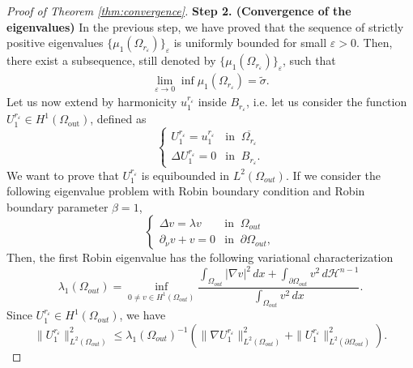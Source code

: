 \documentclass[12pt,reqno]{amsart}
\numberwithin{equation}{section}
\numberwithin{theorem}{section}
\numberwithin{equation}{section}
\numberwithin{theorem}{section}
\begin{document}
\begin{proof}[Proof of Theorem \ref{thm:convergence}]
  \textbf{Step 2. (Convergence of the eigenvalues)}  In the previous step, we have proved that the sequence of strictly positive eigenvalues $ \{\mu_1 (\Omega_{r_{\varepsilon}})\}_{\varepsilon}$ is uniformly bounded for small $\varepsilon >0$. Then, there exist a subsequence, still denoted by $\{\mu_1 (\Omega_{r_{\varepsilon}})\}_{\varepsilon}$, such that
     \begin{align*}
         \lim_{\varepsilon \to 0} \inf \mu_1(\Omega_{r_{\varepsilon}}) = \tilde{\sigma}.
     \end{align*}
Let us now extend by harmonicity $u_1^{r_\varepsilon}$ inside $B_{r_\varepsilon}$, i.e. let us consider
the function $U_1^{r_\varepsilon}\in H^1(\Omega_\mathrm{out})$, defined as
\begin{equation*}
    \begin{cases}
        U_1^{r_\varepsilon}=u_1^{r_\varepsilon} & \text{in}\;\; \overline{\Omega_{r_\varepsilon}}\\
        \Delta U_1^{r_\varepsilon}=0 & \text{in}\;\; B_{r_\varepsilon}.
    \end{cases}
\end{equation*}
We want to prove that $U_1^{r_\varepsilon}$ is equibounded in $L^2(\Omega_{out})$. If we consider the following eigenvalue problem with Robin boundary condition and Robin boundary  parameter $\beta=1$,
\begin{equation*}
\begin{cases}
    \Delta v = \lambda v & \text{in}\;\; \Omega_{out}\\
        \partial_\nu v+v=0 & \text{in}\;\; \partial \Omega_{out},
\end{cases}
\end{equation*}
Then, the first Robin eigenvalue has the following variational characterization
\begin{equation*}
  \lambda_1(\Omega_{out}) = \inf_{0\neq v \in H^1(\Omega_{out})}\frac{\displaystyle\int_{\Omega_{out}}|{\nabla v}|^2\,dx + \int_{\partial \Omega_{out}}v^2\,d\mathcal{H}^{n-1}}{\displaystyle\int_{\Omega_{out}}v^2\,dx}.  
\end{equation*}
Since $U_1^{r_\varepsilon}\in H^1(\Omega_{out})$, we have
\begin{equation*}
    \|U_1^{r_\varepsilon}\|_{L^2(\Omega_{out})}^2\le \lambda_1(\Omega_{out})^{-1}(\|\nabla U_1^{r_\varepsilon}\|_{L^2(\Omega_{out})}^2+\|U_1^{r_\varepsilon}\|_{L^2(\partial \Omega_{out})}^2).

\end{equation*}
\end{proof}
\end{document}
